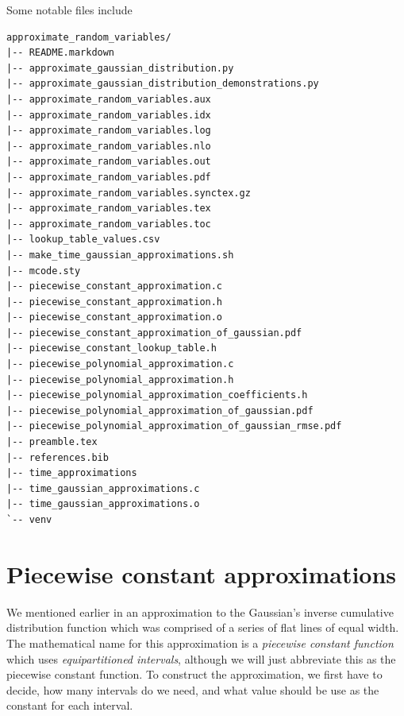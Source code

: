 \documentclass[11pt,a4paper,twoside,english]{extarticle}
\begin{document}
Some notable files include
\begin{lstfloat}[htb]
\begin{verbatim}
approximate_random_variables/
|-- README.markdown
|-- approximate_gaussian_distribution.py
|-- approximate_gaussian_distribution_demonstrations.py
|-- approximate_random_variables.aux
|-- approximate_random_variables.idx
|-- approximate_random_variables.log
|-- approximate_random_variables.nlo
|-- approximate_random_variables.out
|-- approximate_random_variables.pdf
|-- approximate_random_variables.synctex.gz
|-- approximate_random_variables.tex
|-- approximate_random_variables.toc
|-- lookup_table_values.csv
|-- make_time_gaussian_approximations.sh
|-- mcode.sty
|-- piecewise_constant_approximation.c
|-- piecewise_constant_approximation.h
|-- piecewise_constant_approximation.o
|-- piecewise_constant_approximation_of_gaussian.pdf
|-- piecewise_constant_lookup_table.h
|-- piecewise_polynomial_approximation.c
|-- piecewise_polynomial_approximation.h
|-- piecewise_polynomial_approximation_coefficients.h
|-- piecewise_polynomial_approximation_of_gaussian.pdf
|-- piecewise_polynomial_approximation_of_gaussian_rmse.pdf
|-- preamble.tex
|-- references.bib
|-- time_approximations
|-- time_gaussian_approximations.c
|-- time_gaussian_approximations.o
`-- venv
\end{verbatim}
\end{lstfloat}

\clearpage
\section{Piecewise constant approximations}

We mentioned earlier in  an approximation to the Gaussian's inverse cumulative distribution function which was comprised of a series of flat lines of equal width. The mathematical name for this approximation is a \emph{piecewise constant function} which uses \emph{equipartitioned intervals}, although we will just abbreviate this as the piecewise constant function. To construct the approximation, we first have to decide, how many intervals do we need, and what value should be use as the constant for each interval. 
\end{document}
